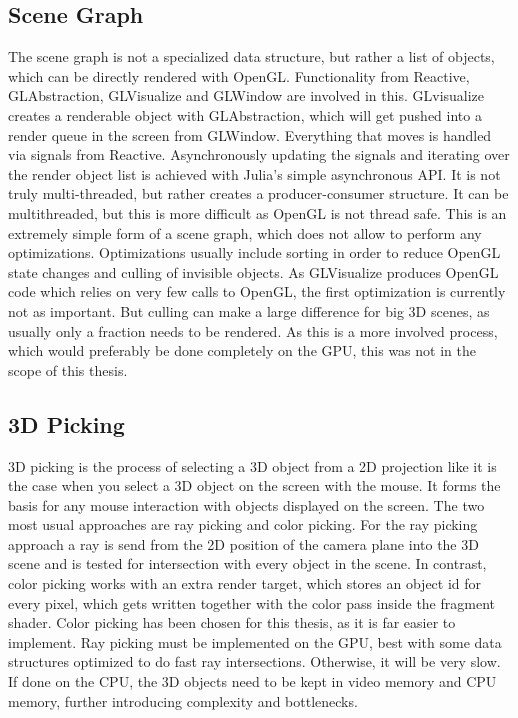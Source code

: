 \subsection{Scene Graph}
The scene graph is not a specialized data structure, but rather a list of objects, which can be directly rendered with OpenGL. Functionality from Reactive, GLAbstraction, GLVisualize and GLWindow are involved in this. GLvisualize creates a renderable object with GLAbstraction, which will get pushed into a render queue in the screen from GLWindow. Everything that moves is handled via signals from Reactive.
Asynchronously updating the signals and iterating over the render object list is achieved with Julia's simple asynchronous API. It is not truly multi-threaded, but rather creates a producer-consumer structure. It can be multithreaded, but this is more difficult as \ac{OpenGL} is not thread safe.
This is an extremely simple form of a scene graph, which does not allow to perform any optimizations.
Optimizations usually include sorting in order to reduce OpenGL state changes and culling of invisible objects.
As GLVisualize produces OpenGL code which relies on very few calls to OpenGL, the first optimization is currently not as important.
But culling can make a large difference for big 3D scenes, as usually only a fraction needs to be rendered.
As this is a more involved process, which would preferably be done completely on the GPU, this was not in the scope of this thesis.

\subsection{3D Picking}

3D picking is the process of selecting a 3D object from a 2D projection like it is the case when you select a 3D object on the screen with the mouse.
It forms the basis for any mouse interaction with objects displayed on the screen.
The two most usual approaches are ray picking and color picking.
For the ray picking approach a ray is send from the 2D position of the camera plane into the 3D scene and is tested for intersection with every object in the scene. In contrast, color picking works with an extra render target, which stores an object id for every pixel, which gets written together with the color pass inside the fragment shader.
Color picking has been chosen for this thesis, as it is far easier to implement. Ray picking must be implemented on the GPU, best with some data structures optimized to do fast ray intersections. Otherwise, it will be very slow. If done on the CPU, the 3D objects need to be kept in video memory and CPU memory, further introducing complexity and bottlenecks.

